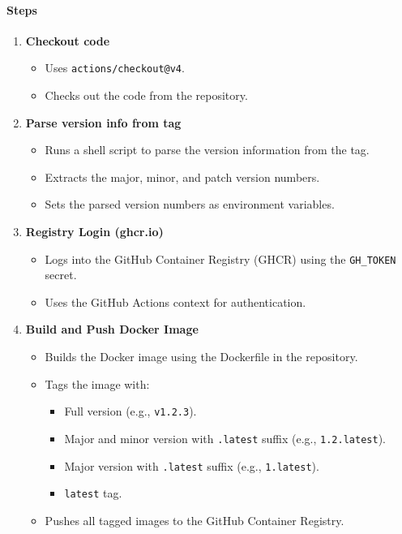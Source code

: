 \paragraph{Steps}
\begin{enumerate}
    \item \textbf{Checkout code}
    \begin{itemize}
        \item Uses \texttt{actions/checkout@v4}.
        \item Checks out the code from the repository.
    \end{itemize}
    \item \textbf{Parse version info from tag}
    \begin{itemize}
        \item Runs a shell script to parse the version information from the tag.
        \item Extracts the major, minor, and patch version numbers.
        \item Sets the parsed version numbers as environment variables.
    \end{itemize}
    \item \textbf{Registry Login (ghcr.io)}
    \begin{itemize}
        \item Logs into the GitHub Container Registry (GHCR) using the \texttt{GH\_TOKEN} secret.
        \item Uses the GitHub Actions context for authentication.
    \end{itemize}
    \item \textbf{Build and Push Docker Image}
    \begin{itemize}
        \item Builds the Docker image using the Dockerfile in the repository.
        \item Tags the image with:
        \begin{itemize}
            \item Full version (e.g., \texttt{v1.2.3}).
            \item Major and minor version with \texttt{.latest} suffix (e.g., \texttt{1.2.latest}).
            \item Major version with \texttt{.latest} suffix (e.g., \texttt{1.latest}).
            \item \texttt{latest} tag.
        \end{itemize}
        \item Pushes all tagged images to the GitHub Container Registry.
    \end{itemize}
\end{enumerate}

